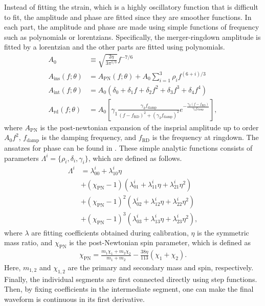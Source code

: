 \documentclass[twocolumn]{aastex631}
\begin{document}
Instead of fitting the strain, which is a highly oscillatory function that is
difficult to fit, the amplitude and phase are fitted since they are smoother
functions. In each part, the amplitude and phase are made using simple functions
of frequency such as polynomials or lorentzians. Specifically, the merger-ringdown 
amplitude is fitted by a lorentzian and the other parts are fitted using polynomials. 
\begin{equation}\label{eq:amplitude}
\begin{aligned}
	A_0&\equiv\sqrt{\frac{2\eta}{3\pi^{1/3}}}f^{-7/6}\\
	A_{\mathrm{ins}}(f;\theta)&=A_{\mathrm{PN}}(f;\theta)+A_0\sum_{i=1}^3\rho_if^{(6+i)/3} \\
	A_{\mathrm{int}}(f;\theta)&=A_0(\delta_0+\delta_1f+\delta_2f^2+\delta_3f^3+\delta_4f^4) \\
	A_{\mathrm{rd}}(f;\theta)&=A_0\left[\gamma_1\frac{\gamma_3f_{\mathrm{damp}}}{(f-f_{\mathrm{RD}})^2+(\gamma_3f_{\mathrm{damp}})^2}e^{-\frac{\gamma_2(f-f_{\mathrm{RD}})}{\gamma_3f_{\mathrm{damp}}}}\right],  
\end{aligned}
\end{equation}
where $A_{\mathrm{PN}}$ is the post-newtonian expansion of the insprial amplitude up to order $A_0f^2$, $f_{\mathrm{damp}}$ is the damping frequency, and $f_{\mathrm{RD}}$ is the frequency at ringdown. The ansatzes for phase can be found in \citep{khan2016frequency}. These simple analytic functions
consists of parameters $\Lambda^i=\{\rho_i,\delta_i,\gamma_i\}$, which are defined as follows. 
\begin{align} \label{eq:Lambda}
	\Lambda^i&=\lambda_{00}^i+\lambda_{10}^i\eta \nonumber \\
	&+(\chi_{\mathrm{PN}}-1)(\lambda_{01}^i+\lambda_{11}^i\eta+\lambda_{21}^i\eta^2) \nonumber \\ 
	&+(\chi_{\mathrm{PN}}-1)^2(\lambda_{02}^i+\lambda_{12}^i\eta+\lambda_{22}^i\eta^2) \nonumber \\
	&+(\chi_{\mathrm{PN}}-1)^3(\lambda_{03}^i+\lambda_{13}^i\eta+\lambda_{23}^i\eta^2),
\end{align}
where $\lambda$ are fitting coefficients obtained during calibration, $\eta$ is
the symmetric mass ratio, and $\chi_{\mathrm{PN}}$ is the post-Newtonian spin
parameter, which is defined as 
\begin{align}
	\chi_{\mathrm{PN}}=\frac{m_1\chi_1+m_2\chi_2}{m_1+m_2}-\frac{38\eta}{113}(\chi_1+\chi_2).
\end{align}
Here, $m_{1,2}$ and $\chi_{1,2}$ are the primary and secondary mass and spin,
respectively. Finally, the individual segments are first connected directly using 
step functions. Then, by fixing coefficients in the intermediate segment, one can make 
the final waveform is continuous in its first derivative.
\end{document}
